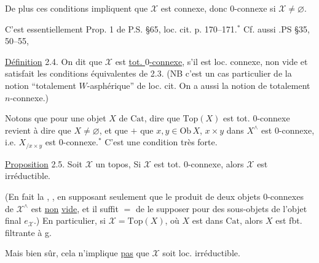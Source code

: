 De plus  ces conditions impliquent que $\mathscr X$ est connexe, donc $0$-connexe si $\mathscr X\ne\varnothing$.



C'est essentiellement Prop. 1 de P.S. \S65, loc. cit. p. 170--171.$^{*}$ Cf. aussi .PS \S35,  50--55,


\uline{Définition} 2.4. On dit que $\mathscr X$ est \uline{tot. $0$-connexe}, s'il est  loc. connexe, non vide et satisfait les conditions équivalentes de 2.3. (NB c'est un cas particulier de la notion ``totalement $W$-asphérique'' de loc. cit. On a aussi la notion de totalement $n$-connexe.)

Notons que pour une  objet $X$ de $\mathrm{Cat}$, dire que $\mathrm{Top}(X)$ est tot. $0$-connexe revient à dire que $X\ne\varnothing$, et que $+$ que $x,y\in\mathrm{Ob}\,X$, $x\times y$ dans $X^{\wedge}$ est $0$-connexe, i.e. $X_{/x\times y}$ est $0$-connexe.$^{*}$ C'est une condition très forte.



\uline{Proposition} 2.5. Soit $\mathscr X$ un topos,  Si $\mathscr X$ est tot. $0$-connexe, alors $\mathscr X$ est irréductible. 

(En fait la  , , en supposant seulement que le produit de deux objets $0$-connexes de $\mathscr X^{\wedge}$ est \uline{non} \uline{vide}, et il suffit $=$ de le supposer pour des sous-objets de l'objet final $e_{\mathscr X}$.) En particulier, si $\mathscr X=\mathrm{Top}(X)$, où $X$ est dans $\mathrm{Cat}$, alors $X$ est fbt. filtrante à g.

Mais  bien sûr,  cela n'implique \uline{pas} que $\mathscr X$ soit loc. irréductible.
